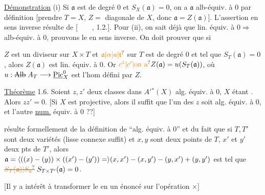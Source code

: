 \uline{Démonstration} (i) Si $\mathfrak a$ est de degré $0$ et $S_X(\mathfrak a)=0$, on a $\mathfrak a$ alb-équiv. à $0$ par définition [prendre $T=X$, $Z=$ diagonale de $X$, donc $\mathfrak a=Z(\mathfrak a)$]. L'assertion en sens inverse résulte de [$\qquad$, 1.2.]. Pour (ii), on sait déjà que lin. équiv. à $0\Longrightarrow$ alb-équiv. à $0$, prouvons le en sens inverse. On doit prouver que si

$Z$ est un diviseur sur $X\times T$ et $\unsure{\mathfrak{a}|\alpha|a|\mathfrak{t}}$ sur $T$ est de degré $0$ et tel que $S_T(\mathfrak{a})=0$, alors $Z(\mathfrak{a})$ est lin. équiv. à $0$. Or $\unsure{c^1|c'|\text{on a}}Z(\mathfrak{a})=u(S_T(\mathfrak{a}))$, où $u:\deleted{\mathrm{Alb}}\;A_T\longrightarrow\underline{\mathrm{Pic}}_X^0$ est l'hom défini par $Z$.

\uline{Théorème} 1.6. Soient $z,z'$ deux classes dans $A'{}^*(X)$ alg. équiv. à $0$, $X$ étant \deleted{[projective]}. Alors $zz'=0$. [Si $X$ est projective, alors il suffit que l'un des  $z$ soit alg. équiv. à $0$, et l'autre \uline{num.} équiv. à $0$ ??]


 résulte formellement de la définition de ``alg. équiv. à $0$''  et du fait que si $T,T'$ sont deux  variétés  (lisse connexe suffit) et $x,y$ sont deux points de $T$, $x'$ et $y'$ deux pts de $T'$, alors $\mathfrak{a}=\inserted{((x)-(y))\times((x')-(y'))=}(x,x')-(x,y')-(y,x')+(y,y')$ est tel que $\deleted{\unsure{S_T(\mathfrak{a})|S_{\mathfrak{a}}}}\;S_{T\times T'}(\mathfrak{a})=0$.



[Il y a intérêt à transformer le  en un énoncé sur l'opération $\times$]

